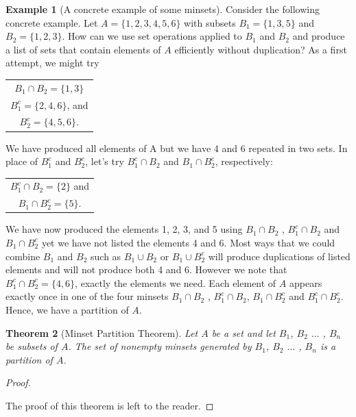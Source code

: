 \documentclass[10pt,]{book}
\theoremstyle{plain}
\newtheorem{theorem}{Theorem}[section]
\theoremstyle{definition}
\theoremstyle{definition}
\newtheorem{example}[theorem]{Example}
\theoremstyle{definition}
\begin{document}
\begin{example}[A concrete example of some minsets]\label{ex-minset-example}
Consider the following concrete example. Let \(A = \{1, 2, 3, 4, 5, 6\}\) with subsets \(B_1 = \{1,3,5\}\) and \(B_2= \{1,2,3\}\). How can we use set operations applied to \(B_1\) and \(B_2\) and produce a list of sets that contain elements of \(A\) efficiently
without duplication? As a first attempt, we might try%
\leavevmode%
\begin{table}
\centering
\begin{tabular}{c}
\(B_1\cap B_2=\{1,3\}\)\tabularnewline[0pt]
\(B_1^c=\{2,4,6\}\), and\tabularnewline[0pt]
\(B_2^c=\{4,5,6\}\).
\end{tabular}
\end{table}
\par
We have produced all elements of A but we have 4 and 6 repeated in two sets. In place of \(B_1^c\) and \(B_2^c\), let's try \(B_1^c\cap B_2\) and \(B_1\cap B_2^c\), respectively:%
\leavevmode%
\begin{table}
\centering
\begin{tabular}{c}
\(B_1^c\cap B_2=\{2\}\) and\tabularnewline[0pt]
\(B_1\cap B_2^c=\{5\}\).
\end{tabular}
\end{table}
\par
We have now produced the elements 1, 2, 3, and 5 using \(B_1\cap B_2\) ,  \(B_1^c\cap B_2\) and \(B_1\cap B_2^c\) yet we have not listed the elements 4 and 6. Most ways that we could combine \(B_1\) and \(B_2\) such as \(B_1\cup B_2\) or \(B_1\cup B_2^c\) will produce duplications of listed
elements and will not produce both 4 and 6. However we note that \(B_1^c\cap B_2^c= \{4, 6\}\), exactly the elements we need.  Each element of \(A\) appears exactly once in one of the four minsets \(B_1\cap B_2\) ,  \(B_1^c\cap B_2\), \(B_1\cap B_2^c\) and \(B_1^c\cap B_2^c\). Hence, we have a partition of \(A\).%
\end{example}
\begin{theorem}[Minset Partition Theorem]\label{th-minset-partition}
 Let \(A\) be a set and let \(B_1\), \(B_2\) \(\ldots\)  , \(B_n\) be subsets of \(A\). The set of nonempty minsets generated by  \(B_1\), \(B_2\) \(\ldots\)  , \(B_n\) is a partition of \(A\).%
\end{theorem}
\begin{proof}\hypertarget{proof-5}{}
The proof of this theorem is left to the reader.%
\end{proof}
\par
\end{document}
